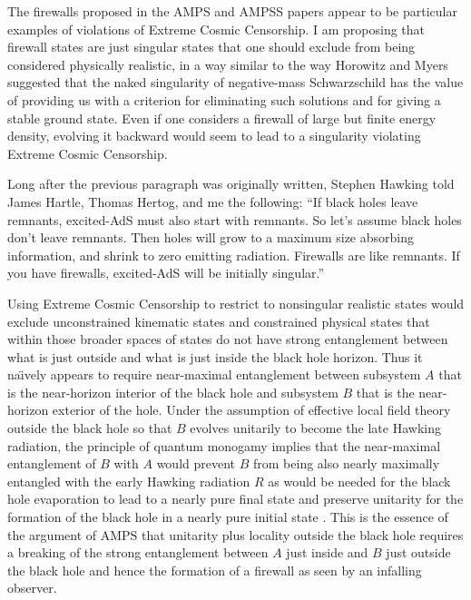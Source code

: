 \documentclass[12pt]{article}
\begin{document}
The firewalls proposed in the AMPS and AMPSS papers \cite{AMPS, AMPSS} appear to be particular examples of violations of Extreme Cosmic Censorship.  I am proposing that firewall states are just singular states that one should exclude from being considered physically realistic, in a way similar to the way Horowitz and Myers \cite{Horowitz:1995ta} suggested that the naked singularity of negative-mass Schwarzschild has the value of providing us with a criterion for eliminating such solutions and for giving a stable ground state.  Even if one considers a firewall of large but finite energy density, evolving it backward would seem to lead to a singularity violating Extreme Cosmic Censorship.

Long after the previous paragraph was originally written, Stephen Hawking \cite{Hawking-2014-04-07} told James Hartle, Thomas Hertog, and me the following:  ``If black holes leave remnants, excited-AdS must also start with remnants.  So let's assume black holes don't leave remnants.  Then holes will grow to a maximum size absorbing information, and shrink to zero emitting radiation.  Firewalls are like remnants.  If you have firewalls, excited-AdS will be initially singular.''

Using Extreme Cosmic Censorship to restrict to nonsingular realistic states would exclude unconstrained kinematic states and constrained physical states that within those broader spaces of states do not have strong entanglement between what is just outside and what is just inside the black hole horizon.  Thus it na\"{\i}vely appears to require near-maximal entanglement between subsystem $A$ that is the near-horizon interior of the black hole and subsystem $B$ that is the near-horizon exterior of the hole.  Under the assumption of effective local field theory outside the black hole so that $B$ evolves unitarily to become the late Hawking radiation, the principle of quantum monogamy \cite{monogamy} implies that the near-maximal entanglement of $B$ with $A$ would prevent $B$ from being also nearly maximally entangled with the early Hawking radiation $R$ as would be needed for the black hole evaporation to lead to a nearly pure final state and preserve unitarity for the formation of the black hole in a nearly pure initial state \cite{AMPS}.  This is the essence of the argument of AMPS that unitarity plus locality outside the black hole requires a breaking of the strong entanglement between $A$ just inside and $B$ just outside the black hole and hence the formation of a firewall as seen by an infalling observer.
\end{document}
